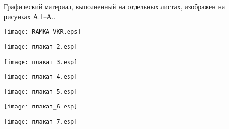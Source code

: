 
Графический материал, выполненный на отдельных листах,
изображен на рисунках А.1--А..
\setcounter{числоПлакатов}{0}

\renewcommand{\thefigure}{А.\arabic{figure}} %

\begin{landscape}

\begin{плакат}
    \texttt{[image: RAMKA\_VKR.eps]}
    \label{RAMKA_VKR.eps:image}      
\end{плакат}

\begin{плакат}
    \texttt{[image: плакат\_2.esp]}
    \label{плакат_2.esp:image}      
\end{плакат}

\begin{плакат}
    \texttt{[image: плакат\_3.esp]}
    \label{плакат_3.esp:image}      
\end{плакат}

\begin{плакат}
	\texttt{[image: плакат\_4.esp]}
	\label{плакат_4.esp:image}      
\end{плакат}

\begin{плакат}
	\texttt{[image: плакат\_5.esp]}
	\label{плакат_5.esp:image}      
\end{плакат}

\begin{плакат}
	\texttt{[image: плакат\_6.esp]}
	\label{плакат_6.esp:image}      
\end{плакат}

\begin{плакат}
	\texttt{[image: плакат\_7.esp]}
	\label{плакат_7.esp:image}      
\end{плакат}

\end{landscape}
